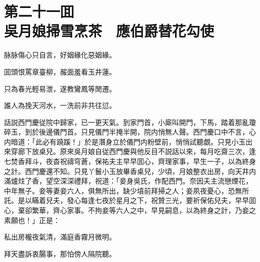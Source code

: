 
\chapter*{第二十一囬　\\吳月娘掃雪烹茶　應伯爵替花勾使}


\begin{myquote}
脉脉傷心只自言，好姻緣化惡姻緣。

囬頭恨罵章臺柳，赧面羞看玉井蓮。

只為春光輕易泄，遂教鸞鳳等閒遷。

誰人為挽天河水，一洗前非共往愆。
\end{myquote}

話説西門慶従院中歸家，已一更天氣。到家門首，小廝叫開門，下馬，踏着那亂瓊碎玉，到於後邊儀門首。只見儀門半掩半開，院内悄無人聲。西門慶口中不言，心内暗道：「此必有蹺蹊！」於是潛身立於儀門内粉壁前，悄悄試聽覷。只見小玉出來穿廊下放桌兒。原來吳月娘自従西門慶與他反目不説話以來，每月吃齋三次，逢七焚香拜斗，夜杳祝禱穹蒼，保祐夫主早早囬心，齊理家事，早生一子，以為終身之計。西門慶還不知。只見丫鬟小玉放畢香桌兒，少頃，月娘整衣出房，向天井内滿爐炷了香，望空深深禮拜，祝道：「妾身吳氏，作配西門。奈因夫主流戀煙花，中年無子。妾等妻妾六人，俱無所出，缺少墳前拜掃之人；妾夙夜憂心，恐無所託。是以瞞着兒夫，發心每逢七夜於星月之下，祝贊三光，要祈保佑兒夫，早早囬心，棄卻繁華，齊心家事。不拘妾等六人之中，早見嗣息，以為終身之計，乃妾之素願也！」正是：

\begin{myquote}
私出房櫳夜氣清，滿庭香霧月微明。

拜天盡訴衷腸事，那怕傍人隔院聽。
\end{myquote}

